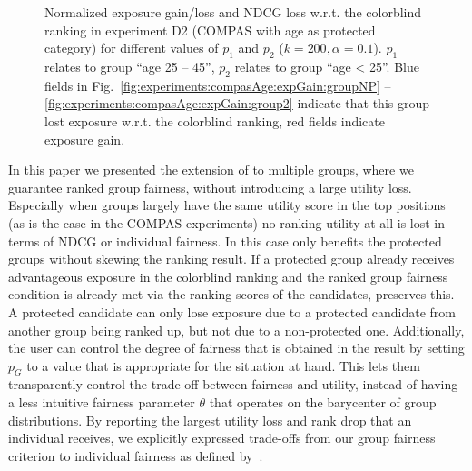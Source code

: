 \begin{figure}[t!]
	\vspace{-3mm}
	\caption{Normalized exposure gain/loss and NDCG loss w.r.t. the colorblind ranking in experiment D2 (COMPAS with age as protected category) for different values of $p_1$ and $p_2$ ($k=200, \alpha=0.1$).
		$p_1$ relates to group ``age 25 -- 45'', $p_2$ relates to group ``age < 25''.
		Blue fields in Fig.~\ref{fig:experiments:compasAge:expGain:groupNP} -- \ref{fig:experiments:compasAge:expGain:group2} indicate that this group lost exposure w.r.t. the colorblind ranking, red fields indicate exposure gain.
	}
	\label{fig:results-moving-p}
\end{figure}

In this paper we presented the extension of \algoFAIR to multiple groups, where we guarantee ranked group fairness, without introducing a large utility loss.
%
Especially when groups largely have the same utility score in the top positions (as is the case in the COMPAS experiments) no ranking utility at all is lost in terms of NDCG or individual fairness.
%
In this case \algoFAIR only benefits the protected groups without skewing the ranking result.
%
If a protected group already receives advantageous exposure in the colorblind ranking and the ranked group fairness condition is already met via the ranking scores of the candidates, \algoFAIR preserves this.
%
A protected candidate can only lose exposure due to a protected candidate from another group being ranked up, but not due to a non-protected one.
%
Additionally, the user can control the degree of fairness that is obtained in the result by setting $p_G$ to a value that is appropriate for the situation at hand.
%
This lets them transparently control the trade-off between fairness and utility, instead of having a less intuitive fairness parameter $\theta$ that operates on the barycenter of group distributions.
%
By reporting the largest utility loss and rank drop that an individual receives, we explicitly expressed trade-offs from our group fairness criterion to individual fairness as defined by~\citet{Dwork2012}.

